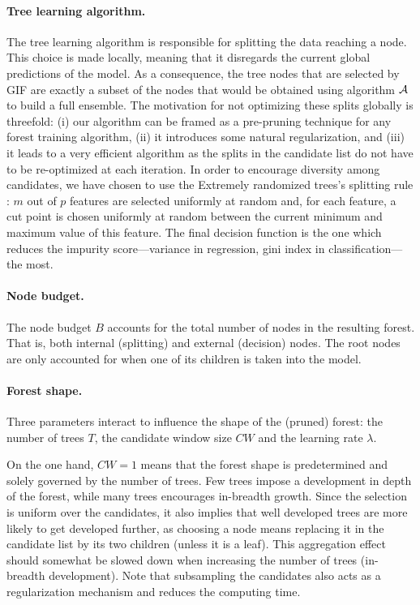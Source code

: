 \documentclass{article}
\begin{document}
\paragraph{Tree learning algorithm.}
The tree learning algorithm is responsible for splitting the data
reaching a node. This choice is made locally, meaning that it
disregards the current global predictions of the model. As a
consequence, the tree nodes that are selected by GIF are exactly a
subset of the nodes that would be obtained using algorithm ${\cal A}$
to build a full ensemble. The motivation for not optimizing these
splits globally is threefold: (i) our algorithm can be framed as a
pre-pruning technique for any forest training algorithm, (ii) it
introduces some natural regularization, and (iii) it leads to a very
efficient algorithm as the splits in the candidate list do not have to
be re-optimized at each iteration. In order to encourage diversity
among candidates, we have chosen to use the Extremely randomized
trees's splitting rule \cite{extratrees}: $m$ out of $p$ features are
selected uniformly at random and, for each feature, a cut point is
chosen uniformly at random between the current minimum and maximum
value of this feature. The final decision function is the one which
reduces the impurity score---variance in regression, gini index in
classification---the most.

\paragraph{Node budget.}
The node budget $B$ accounts for the total number of nodes in the resulting 
forest. That is, both internal (splitting) and external (decision) nodes. The 
root nodes are only accounted for when one of its children is taken into the 
model.

\paragraph{Forest shape.}
Three parameters interact to influence the shape of the (pruned)
forest: the number of trees $T$, the candidate window size $CW$ and
the learning rate $\lambda$.

On the one hand, $CW=1$ means that the forest shape is predetermined and 
solely governed by the number of trees. Few trees impose a development in 
depth of the forest, while many trees encourages in-breadth growth. Since the 
selection is uniform over the candidates, it also implies that well developed 
trees are more likely to get developed further, as choosing a node means 
replacing it in the candidate list by its two children (unless it is a leaf). 
This aggregation effect should somewhat be slowed down when increasing the 
number of trees (in-breadth development). Note that subsampling the candidates 
also acts as a regularization mechanism and reduces the computing time.
\end{document}
